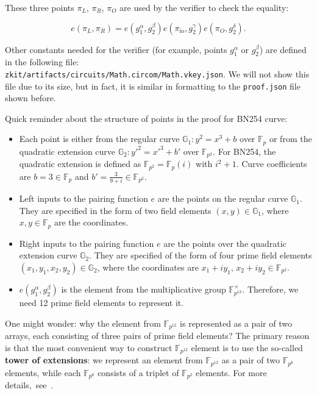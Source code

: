 \documentclass[../../book.tex]{subfiles}
\begin{document}
These three points $\pi_L$, $\pi_R$, $\pi_O$ are used by the verifier to check the equality:

\vspace{-0.5em}

\[
    e(\pi_L, \pi_R) = e(g_1^\alpha, g_2^\beta)e(\pi_{\text{io}},g_2^\gamma)e(\pi_O,g_2^\delta).
\]

\vspace{-0.5em}

Other constants needed for the verifier (for example, points $g_1^{\alpha}$ or $g_2^{\beta}$) are defined
in the following file: \\ \texttt{zkit/artifacts/circuits/Math.circom/Math.vkey.json}. 
We will not show this file due to its size, but in fact, it is similar in formatting to the \texttt{proof.json}
file shown before.

Quick reminder about the structure of points in the proof for BN254 curve:
\begin{itemize}
    \item Each point is either from the regular curve $\mathbb{G}_1: y^2=x^3+b$ over $\mathbb{F}_p$ or from the quadratic extension curve $\mathbb{G}_2: y'^2=x'^3+b'$ over $\mathbb{F}_{p^2}$. For BN254, the quadratic extension is defined as $\mathbb{F}_{p^2} = \mathbb{F}_p(i)$ with $i^2+1$. Curve coefficients are $b=3 \in \mathbb{F}_p$ and $b'=\frac{3}{9+i} \in \mathbb{F}_{p^2}$.
    \item Left inputs to the pairing function $e$ are the points on the regular curve $\mathbb{G}_1$. They are specified in the form of two field elements $(x,y) \in \mathbb{G}_1$, where $x, y \in \mathbb{F}_p$ are the coordinates.
    \item Right inputs to the pairing function $e$ are the points over the quadratic extension curve $\mathbb{G}_2$. They are specified of the form of four prime field elements $(x_{1}, y_{1}, x_{2}, y_2) \in \mathbb{G}_2$, where the coordinates are $x_1+iy_1$, $x_2+iy_2 \in \mathbb{F}_{p^2}$.
    \item $e(g_1^{\alpha}, g_2^{\beta})$ is the element from the multiplicative group $\mathbb{F}_{p^{12}}^{\times}$. Therefore, we need 12 prime field elements to represent it.
\end{itemize}

\begin{remark}
    One might wonder: why the element from $\mathbb{F}_{p^{12}}$ is represented as a pair of two arrays,
    each consisting of three pairs of prime field elements? The primary reason is that the most convenient
    way to construct $\mathbb{F}_{p^{12}}$ element is to use the so-called \textbf{tower of extensions}: we represent
    an element from $\mathbb{F}_{p^{12}}$ as a pair of two $\mathbb{F}_{p^6}$ elements, while each $\mathbb{F}_{p^6}$
    consists of a triplet of $\mathbb{F}_{p^2}$ elements. For more details,~see~.
\end{remark}
\end{document}
